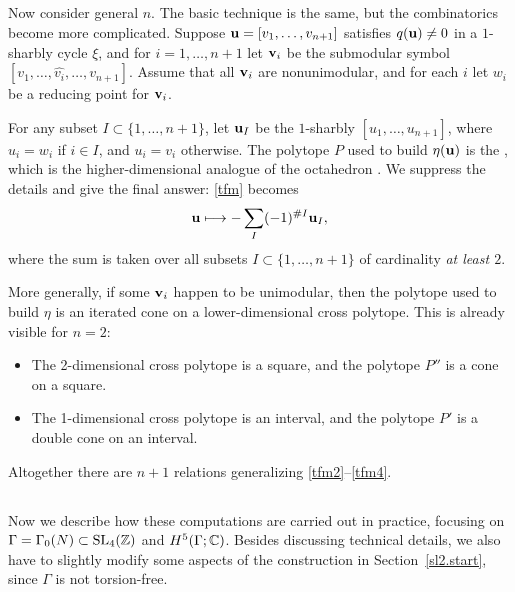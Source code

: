 \subsection{}
%
Now consider general $n$.  The basic technique is the same, but the
combinatorics become more complicated.  Suppose ${\mathbf {u}} = [v_{1},\dots ,v_{n+1}]$
satisfies $q ({\mathbf {u}} )\not =0$ in a $1$-sharbly cycle $\xi$, and for
$i=1,\dots ,n+1$ let ${\mathbf {v}}_{i} $ be the submodular symbol $[v_{1},\dots
,\widehat{v_{i}},\dots ,v_{n+1}]$.  Assume that all ${\mathbf {v}}_{i}$ are
nonunimodular, and for each $i$ let $w_{i}$ be a reducing point for
${\mathbf {v}}_{i}$.

For any subset $I\subset\{1,\dots ,n+1 \}$, let ${\mathbf {u}}_{I}$ be the
$1$-sharbly $[u_{1},\dots ,u_{n+1}]$, where $u_{i}=w_{i}$ if $i\in I$,
and $u_{i}=v_{i}$ otherwise.  The polytope $P$ used to build $\eta
({\mathbf {u}})$ is the , which is the higher-dimensional
analogue of the octahedron \cite[\S4.4]{experimental}.  We suppress the
details and give the final answer:
\eqref{tfm} becomes
\begin{equation}\label{tfmrelation}
{\mathbf {u}} \longmapsto -\sum _{I} (-1)^{\#I}{\mathbf {u}}_{I},
\end{equation}
where the sum is taken over all subsets $I\subset \{1,\dotsc ,n+1 \}$ 
of cardinality \emph{at least $2$}.  

More generally, if some ${\mathbf {v}}_{i}$ happen to be unimodular, then the
polytope used to build $\eta$ is an iterated cone on a
lower-dimensional cross polytope.  This is already visible for $n=2$:
\begin{itemize}
\item The 2-dimensional cross polytope is a
square, and the polytope $P''$ is
a cone on a square.
\item The 1-dimensional cross polytope is an interval, and the
polytope $P'$ is a double cone on an interval.
\end{itemize}
Altogether there are $n+1$ relations generalizing
\eqref{tfm2}--\eqref{tfm4}.

\subsection{}\label{ss:sl4computations}
%
Now we describe how these computations are carried out in practice,
focusing on $\Gamma = \Gamma_{0} (N)\subset \operatorname{SL}_{4} (\mathbb{Z})$ and $H^{5}
(\Gamma; \mathbb{C})$.  Besides discussing technical details,
we also have to slightly modify some aspects of the construction in
Section~\ref{sl2.start}, since $\Gamma$ is not torsion-free.

